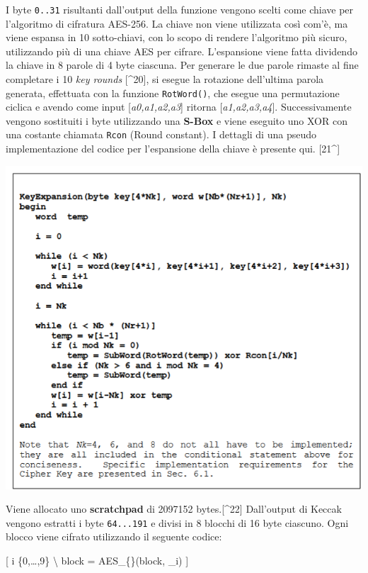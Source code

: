 \documentclass[
]{article}
\begin{document}
I byte \texttt{0..31} risultanti dall'output della funzione vengono
scelti come chiave per l'algoritmo di cifratura AES-256. La chiave non
viene utilizzata così com'è, ma viene espansa in 10 sotto-chiavi, con lo
scopo di rendere l'algoritmo più sicuro, utilizzando più di una chiave
AES per cifrare. L'espansione viene fatta dividendo la chiave in 8
parole di 4 byte ciascuna. Per generare le due parole rimaste al fine
completare i 10 \emph{key rounds} {[}\^{}20{]}, si esegue la rotazione
dell'ultima parola generata, effettuata con la funzione
\texttt{RotWord()}, che esegue una permutazione ciclica e avendo come
input {[}\emph{a0,a1,a2,a3}{]} ritorna {[}\emph{a1,a2,a3,a4}{]}.
Successivamente vengono sostituiti i byte utilizzando una \textbf{S-Box}
e viene eseguito uno XOR con una costante chiamata \texttt{Rcon} (Round
constant). I dettagli di una pseudo implementazione del codice per
l'espansione della chiave è presente qui. {[}21\^{}{]}

\includegraphics{media/image8.png}

Viene allocato uno \textbf{scratchpad} di 2097152 bytes.{[}\^{}22{]}
Dall'output di Keccak vengono estratti i byte \texttt{64...191} e divisi
in 8 blocchi di 16 byte ciascuno. Ogni blocco viene cifrato utilizzando
il seguente codice:

{[}  i \in \{0,\ldots,9\} \Rightarrow \textbackslash{}
\quad block = AES\_\{\}(block, \_i) {]}
\end{document}
